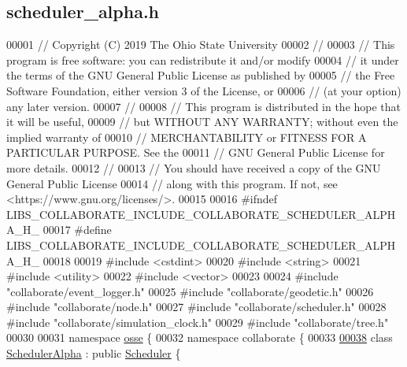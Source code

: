 \hypertarget{scheduler__alpha_8h_source}{}\subsection{scheduler\+\_\+alpha.\+h}
\label{scheduler__alpha_8h_source}

\begin{DoxyCode}
00001 \textcolor{comment}{// Copyright (C) 2019 The Ohio State University}
00002 \textcolor{comment}{//}
00003 \textcolor{comment}{// This program is free software: you can redistribute it and/or modify}
00004 \textcolor{comment}{// it under the terms of the GNU General Public License as published by}
00005 \textcolor{comment}{// the Free Software Foundation, either version 3 of the License, or}
00006 \textcolor{comment}{// (at your option) any later version.}
00007 \textcolor{comment}{//}
00008 \textcolor{comment}{// This program is distributed in the hope that it will be useful,}
00009 \textcolor{comment}{// but WITHOUT ANY WARRANTY; without even the implied warranty of}
00010 \textcolor{comment}{// MERCHANTABILITY or FITNESS FOR A PARTICULAR PURPOSE.  See the}
00011 \textcolor{comment}{// GNU General Public License for more details.}
00012 \textcolor{comment}{//}
00013 \textcolor{comment}{// You should have received a copy of the GNU General Public License}
00014 \textcolor{comment}{// along with this program.  If not, see <https://www.gnu.org/licenses/>.}
00015 
00016 \textcolor{preprocessor}{#ifndef LIBS\_COLLABORATE\_INCLUDE\_COLLABORATE\_SCHEDULER\_ALPHA\_H\_}
00017 \textcolor{preprocessor}{#define LIBS\_COLLABORATE\_INCLUDE\_COLLABORATE\_SCHEDULER\_ALPHA\_H\_}
00018 
00019 \textcolor{preprocessor}{#include <cstdint>}
00020 \textcolor{preprocessor}{#include <string>}
00021 \textcolor{preprocessor}{#include <utility>}
00022 \textcolor{preprocessor}{#include <vector>}
00023 
00024 \textcolor{preprocessor}{#include "collaborate/event\_logger.h"}
00025 \textcolor{preprocessor}{#include "collaborate/geodetic.h"}
00026 \textcolor{preprocessor}{#include "collaborate/node.h"}
00027 \textcolor{preprocessor}{#include "collaborate/scheduler.h"}
00028 \textcolor{preprocessor}{#include "collaborate/simulation\_clock.h"}
00029 \textcolor{preprocessor}{#include "collaborate/tree.h"}
00030 
00031 \textcolor{keyword}{namespace }\hyperlink{namespaceosse}{osse} \{
00032 \textcolor{keyword}{namespace }collaborate \{
00033 
\hyperlink{classosse_1_1collaborate_1_1_scheduler_alpha}{00038} \textcolor{keyword}{class }\hyperlink{classosse_1_1collaborate_1_1_scheduler_alpha}{SchedulerAlpha} : \textcolor{keyword}{public} \hyperlink{classosse_1_1collaborate_1_1_scheduler}{Scheduler} \{

\end{DoxyCode}
